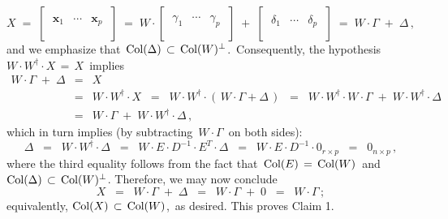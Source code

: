 \begin{enumerate}
\begin{equation*}
	X
	\;=\; \left[\;
		\begin{array}{ccc}
		\\
		\mathbf{x}_{1} & \cdots & \mathbf{x}_{p}
		\\
		\\
		\end{array}
		\;\right]
	\;=\;
		W \cdot \left[\;
			\begin{array}{ccc}
			\\
			\gamma_{1} & \cdots & \gamma_{p}
			\\
			\\
			\end{array}
			\;\right]
		\; + \;
			\left[\;
			\begin{array}{ccc}
			\\
			\delta_{1} & \cdots & \delta_{p}
			\\
			\\
			\end{array}
			\;\right]
	\;=\;
		W \cdot \Gamma \; + \; \Delta\,,
	\end{equation*}
	and we emphasize that \,$\textnormal{Col}(\Delta) \,\subset\, \textnormal{Col}(W)^{\perp}$.\,
	Consequently, the hypothesis \,$W \cdot W^{\dagger} \cdot X \,=\, X$\, implies
	\begin{eqnarray*}
	W \cdot \Gamma \;+\; \Delta
	&=& X
	\\
	&=& W \cdot W^{\dagger} \cdot X
	\;\;=\;\; W \cdot W^{\dagger} \cdot (\,W \cdot \Gamma + \Delta\,)
	\;\;=\;\; W \cdot W^{\dagger} \cdot W \cdot \Gamma \;+\; W \cdot W^{\dagger} \cdot \Delta
	\\
	&=& W \cdot \Gamma \;+\; W \cdot W^{\dagger} \cdot \Delta\,,
	\end{eqnarray*}
	which in turn implies (by subtracting \,$W \cdot \Gamma$\, on both sides):
	\begin{equation*}
	\Delta
	\;\; = \;\;
		W \cdot W^{\dagger} \cdot \Delta 
	\;\; = \;\;
		W \cdot E \cdot D^{-1} \cdot E^{T} \cdot \Delta 
	\;\; = \;\;
		W \cdot E \cdot D^{-1} \cdot 0_{r \times p}
	\;\; = \;\;
		0_{n \times p}\,,
	\end{equation*}
	where the third equality follows from the fact that
	\,$\textnormal{Col}(E) \,=\, \textnormal{Col}(W)$\, and \,$\textnormal{Col}(\Delta) \,\subset\, \textnormal{Col}(W)^{\perp}$.
	Therefore, we may now conclude
	\begin{equation*}
	X \;\; = \;\; W \cdot \Gamma \; + \; \Delta \;\; = \;\; W \cdot \Gamma \;+\; 0 \;\; = \;\; W \cdot \Gamma\,;
	\end{equation*}
	equivalently, $\textnormal{Col}(X) \,\subset\, \textnormal{Col}(W)$,\, as desired.
	This proves Claim 1.


\end{enumerate}
